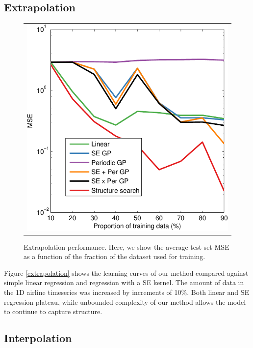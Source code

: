 \documentclass[twoside]{article}
\begin{document}
\subsection{Extrapolation}

\begin{figure}[h!]
\centering
\begin{tabular}{c}
\hspace{-0.5cm} \includegraphics[width=\columnwidth]{../figures/extrapolation_curves/01-airline-s-ex-curve.pdf}
\end{tabular}
\caption{Extrapolation performance.  Here, we show the average test set MSE as a function of the fraction of the dataset used for training.}
\end{figure}

Figure \ref{extrapolation} shows the learning curves of our method compared against simple linear regression and \gp{} regression with a SE kernel.  The amount of data in the 1D airline timeseries was increased by increments of 10\%. Both linear and SE regression plateau, while unbounded complexity of our method allows the model to continue to capture structure. 

\subsection{Interpolation}
\end{document}
